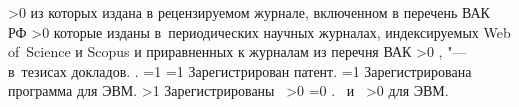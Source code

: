 {\begin{refsection}
        \ifnum \value{citeauthorvak}>0
             из которых издана в рецензируемом журнале, включенном в перечень ВАК РФ%
        \fi
        \ifnum \value{citeauthorscopuswos}>0%
            которые изданы в~периодических научных журналах, индексируемых Web of~Science и Scopus
            и приравненных к журналам из перечня ВАК%
        \fi%
        \ifnum \value{citeauthorconf}>0%
            ,  "--- в~тезисах докладов.
        \else%
            .
        \fi%
        \ifnum \value{citeregistered}=1%
            \ifnum \value{citeauthorpatent}=1%
                Зарегистрирован  патент.
            \fi%
            \ifnum \value{citeauthorprogram}=1%
                Зарегистрирована  программа для ЭВМ.
            \fi%
        \fi%
        \ifnum \value{citeregistered}>1%
            Зарегистрированы\ %
            \ifnum \value{citeauthorpatent}>0%
                \ifnum \value{citeauthorprogram}=0 . \else \ и~\fi%
            \fi%
            \ifnum \value{citeauthorprogram}>0%
                 для ЭВМ.
            \fi%
        \fi%
    \end{refsection}%
    \begin{refsection}
    \end{refsection}%
}



